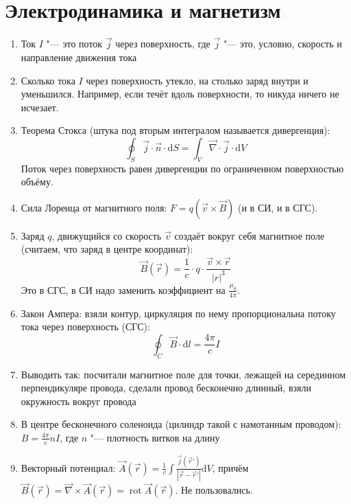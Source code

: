 \documentclass[10pt,a4paper]{article}
\renewcommand{\d}{\mathrm{d}}
\DeclareMathOperator{\rot}{rot}
\begin{document}
\section{Электродинамика и магнетизм}
\begin{enumerate}
\item Ток $I$ "--- это поток $\vec j$ через поверхность, где $\vec j$ "--- это, условно, скорость и направление движения тока
\item Сколько тока $I$ через поверхность утекло, на столько заряд внутри и уменьшился. Например, если течёт вдоль поверхности, то никуда ничего не исчезает.
\item Теорема Стокса (штука под вторым интегралом называется дивергенция):
\[ \oint_S \vec j \cdot \vec n \cdot \d S = \int_V \vec \nabla \cdot \vec j \cdot \d V \]
Поток через поверхность равен дивергенции по ограниченном поверхностью объёму.
\item Сила Лоренца от магнитного поля: $F = q(\vec v \times \vec B)$ (и в СИ, и в СГС).
\item Заряд $q$, движущийся со скорость $\vec v$ создаёт вокруг себя магнитное поле (считаем, что заряд в центре координат):
\[ \vec B(\vec r) = \frac{1}{c} \cdot q \cdot \frac{\vec v \times \vec r}{|r|^3} \]
Это в СГС, в СИ надо заменить коэффициент на $\frac{\mu_0}{4\pi}$.
\item Закон Ампера: взяли контур, циркуляция по нему пропорциональна потоку тока через поверхность (СГС):
\[ \oint_C \vec B \cdot \d l = \frac{4\pi}{c} I \]
\item Выводить так: посчитали магнитное поле для точки, лежащей на серединном перпендикуляре провода, сделали провод бесконечно длинный, взяли окружность вокруг провода
\item В центре бесконечного соленоида (цилиндр такой с намотанным проводом): $B = \frac{4\pi}{c} n I$, где $n$ "--- плотность витков на длину
\item Векторный потенциал: $\vec A(\vec r) = \frac{1}{c}\int \frac{\vec j(\vec r')}{|\vec r - \vec r'|} \d V$, причём $\vec B(\vec r) = \vec \nabla \times \vec A(\vec r) = \rot \vec A(\vec r)$.
Не пользовались.
\end{enumerate}
\end{document}
